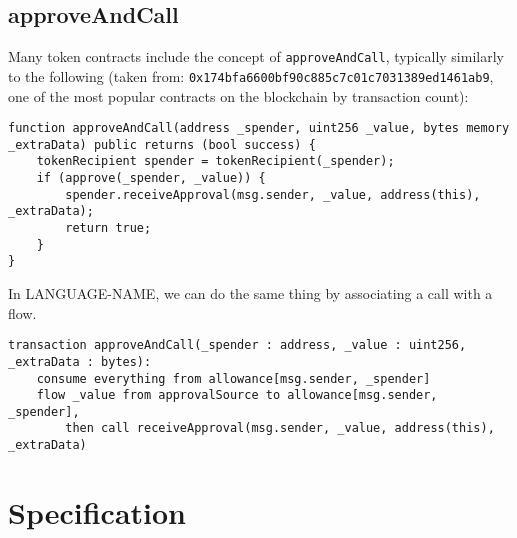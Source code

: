 \documentclass[10pt]{article}
\newcommand{\langName}{LANGUAGE-NAME\xspace}
\begin{document}
\subsection{approveAndCall}

Many token contracts include the concept of \lstinline{approveAndCall}, typically similarly to the following (taken from: \lstinline{0x174bfa6600bf90c885c7c01c7031389ed1461ab9}, one of the most popular contracts on the blockchain by transaction count):
\begin{lstlisting}
function approveAndCall(address _spender, uint256 _value, bytes memory _extraData) public returns (bool success) {
    tokenRecipient spender = tokenRecipient(_spender);
    if (approve(_spender, _value)) {
        spender.receiveApproval(msg.sender, _value, address(this), _extraData);
        return true;
    }
}
\end{lstlisting}

In \langName, we can do the same thing by associating a call with a flow.
\begin{lstlisting}
transaction approveAndCall(_spender : address, _value : uint256, _extraData : bytes):
    consume everything from allowance[msg.sender, _spender]
    flow _value from approvalSource to allowance[msg.sender, _spender],
        then call receiveApproval(msg.sender, _value, address(this), _extraData)
\end{lstlisting}

\section{Specification}
\end{document}
